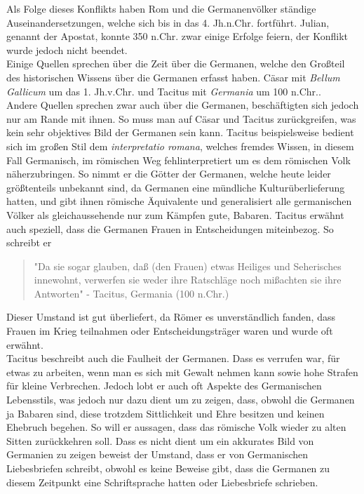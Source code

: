 \documentclass{article}
\begin{document}
	Als Folge dieses Konflikts haben Rom und die Germanenvölker ständige Auseinandersetzungen, welche sich bis in das 4. Jh.n.Chr. fortführt. Julian, genannt der Apostat, konnte 350 n.Chr. zwar einige Erfolge feiern, der Konflikt wurde jedoch nicht beendet. \\
	Einige Quellen sprechen über die Zeit über die Germanen, welche den Großteil des historischen Wissens über die Germanen erfasst haben. Cäsar mit \textit{Bellum Gallicum} um das 1. Jh.v.Chr. und Tacitus mit \textit{Germania} um 100 n.Chr.. \\
	Andere Quellen sprechen zwar auch über die Germanen, beschäftigten sich jedoch nur am Rande mit ihnen. So muss man auf Cäsar und Tacitus zurückgreifen, was kein sehr objektives Bild der Germanen sein kann. Tacitus beispielsweise bedient sich im großen Stil dem \textit{interpretatio romana}, welches fremdes Wissen, in diesem Fall Germanisch, im römischen Weg  fehlinterpretiert um es dem römischen Volk näherzubringen. So nimmt er die Götter der Germanen, welche heute leider größtenteils unbekannt sind, da Germanen eine mündliche Kulturüberlieferung hatten, und gibt ihnen römische Äquivalente und generalisiert alle germanischen Völker als gleichaussehende nur zum Kämpfen gute, Babaren. Tacitus erwähnt auch speziell, dass die Germanen Frauen in Entscheidungen miteinbezog. So schreibt er 
	\begin{quote}
	"Da sie sogar glauben, daß (den Frauen) etwas Heiliges und Seherisches innewohnt, verwerfen sie weder ihre Ratschläge noch mißachten sie ihre Antworten" - Tacitus, Germania (100 n.Chr.)
	\end{quote}
	Dieser Umstand ist gut überliefert, da Römer es unverständlich fanden, dass Frauen im Krieg teilnahmen oder Entscheidungsträger waren und wurde oft erwähnt. \\
	Tacitus beschreibt auch die Faulheit der Germanen. Dass es verrufen war, für etwas zu arbeiten, wenn man es sich mit Gewalt nehmen kann sowie hohe Strafen für kleine Verbrechen.
	Jedoch lobt er auch oft Aspekte des Germanischen Lebensstils, was jedoch nur dazu dient um zu zeigen, dass, obwohl die Germanen ja Babaren sind, diese trotzdem Sittlichkeit und Ehre besitzen und keinen Ehebruch begehen. So will er aussagen, dass das römische Volk wieder zu alten Sitten zurückkehren soll. Dass es nicht dient um ein akkurates Bild von Germanien zu zeigen beweist der Umstand, dass er von Germanischen Liebesbriefen schreibt, obwohl es keine Beweise gibt, dass die Germanen zu diesem Zeitpunkt eine Schriftsprache hatten oder Liebesbriefe schrieben. \\
\end{document}

